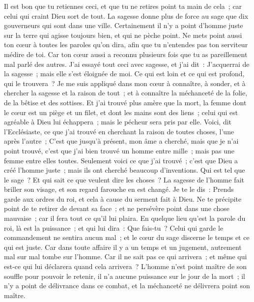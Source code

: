 \begin{multicols}{2}
Il est bon que tu retiennes ceci, et que tu ne retires point ta main de cela~; car celui qui craint Dieu sort de tout.
La sagesse donne plus de force au sage que dix gouverneurs qui sont dans une ville.
Certainement il n'y a point d'homme juste sur la terre qui agisse toujours bien, et qui ne pèche point.
Ne mets point aussi ton cœur à toutes les paroles qu'on dira, afin que tu n'entendes pas ton serviteur médire de toi. 
Car ton cœur aussi a reconnu plusieurs fois que tu as pareillement mal parlé des autres. 
J'ai essayé tout ceci avec sagesse, et j'ai dit~: J'acquerrai de la sagesse~; mais elle s'est éloignée de moi. 
Ce qui est loin et ce qui est profond, qui le trouvera~?
Je me suis appliqué dans mon cœur à connaître, à sonder, et à chercher la sagesse et la raison de tout~; et à connaître la méchanceté de la folie, de la bêtise et des sottises. 
Et j'ai trouvé plus amère que la mort, la femme dont le cœur est un piège et un filet, et dont les mains sont des liens~; celui qui est agréable à Dieu lui échappera~; mais le pécheur sera pris par elle.
Voici, dit l'Ecclésiaste, ce que j'ai trouvé en cherchant la raison de toutes choses, l'une après l'autre~;
C'est que jusqu'à présent, mon âme a cherché, mais que je n'ai point trouvé, c'est que j'ai bien trouvé un homme entre mille~; mais pas une femme entre elles toutes. 
Seulement voici ce que j'ai trouvé~; c'est que Dieu a créé l'homme juste~; mais ils ont cherché beaucoup d'inventions.
\VerseOne{}Qui est tel que le sage~? Et qui sait ce que veulent dire les choses~? La sagesse de l'homme fait briller son visage, et son regard farouche en est changé.
Je te le dis~: Prends garde aux ordres du roi, et cela à cause du serment fait à Dieu.
Ne te précipite point de te retirer de devant sa face~; et ne persévère point dans une chose mauvaise~; car il fera tout ce qu'il lui plaira. 
En quelque lieu qu'est la parole du roi, là est la puissance~; et qui lui dira~: Que fais-tu~? 
Celui qui garde le commandement ne sentira aucun mal~; et le cœur du sage discerne le temps et ce qui est juste. 
Car dans toute affaire il y a un temps et un jugement, autrement mal sur mal tombe sur l'homme. 
Car il ne sait pas ce qui arrivera~; et même qui est-ce qui lui déclarera quand cela arrivera~? 
L'homme n'est point maître de son souffle pour pouvoir le retenir, il n'a aucune puissance sur le jour de la mort~; il n'y a point de délivrance dans ce combat, et la méchanceté ne délivrera point son maître.

\end{multicols}
